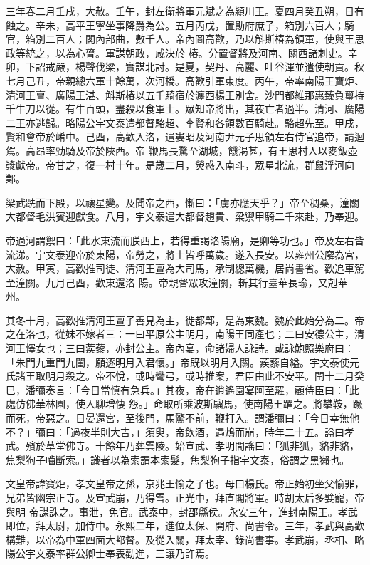 \begin{pinyinscope}
 三年春二月壬戌，大赦。壬午，封左衛將軍元斌之為潁川王。夏四月癸丑朔，日有蝕之。辛未，高平王寧坐事降爵為公。五月丙戌，置勛府庶子，箱別六百人；騎官，箱別二百人；閣內部曲，數千人。帝內圖高歡，乃以斛斯椿為領軍，使與王思政等統之，以為心膂。軍謀朝政，咸決於
 椿。分置督將及河南、關西諸刺史。辛卯，下詔戒嚴，楊聲伐梁，實謀北討。是夏，契丹、高麗、吐谷渾並遣使朝貢。秋七月己丑，帝親總六軍十餘萬，次河橋。高歡引軍東度。丙午，帝率南陽王寶炬、清河王亶、廣陽王湛、斛斯椿以五千騎宿於瀍西楊王別舍。沙門都維那惠臻負璽持千牛刀以從。有牛百頭，盡殺以食軍士。眾知帝將出，其夜亡者過半。清河、廣陽二王亦逃歸。略陽公宇文泰遣都督駱超、李賢和各領數百騎赴。駱超先至。甲戌，賢和會帝於崤中。己酉，高歡入洛，遣婁昭及河南尹元子思領左右侍官追帝，請迴駕。高昂率勁騎及帝於陜西。帝
 鞭馬長騖至湖城，饑渴甚，有王思村人以麥飯壺漿獻帝。帝甘之，復一村十年。是歲二月，熒惑入南斗，眾星北流，群鼠浮河向鄴。



 梁武跣而下殿，以禳星變。及聞帝之西，慚曰：「虜亦應天乎？」帝至稠桑，潼關大都督毛洪賓迎獻食。八月，宇文泰遣大都督趙貴、梁禦甲騎二千來赴，乃奉迎。



 帝過河謂禦曰：「此水東流而朕西上，若得重謁洛陽廟，是卿等功也。」帝及左右皆流涕。宇文泰迎帝於東陽，帝勞之，將士皆呼萬歲。遂入長安。以雍州公廨為宮，大赦。甲寅，高歡推司徒、清河王亶為大司馬，承制總萬機，居尚書省。歡追車駕至潼關。九月己酉，歡東還洛
 陽。帝親督眾攻潼關，斬其行臺華長瑜，又剋華州。



 其冬十月，高歡推清河王亶子善見為主，徙都鄴，是為東魏。魏於此始分為二。帝之在洛也，從妹不嫁者三：一曰平原公主明月，南陽王同產也；二曰安德公主，清河王懌女也；三曰蒺藜，亦封公主。帝內宴，命諸婦人詠詩。或詠鮑照樂府曰：「朱門九重門九閨，願逐明月入君懷。」帝既以明月入關。蒺藜自縊。宇文泰使元氏諸王取明月殺之。帝不悅，或時彎弓，或時推案，君臣由此不安平。閏十二月癸巳，潘彌奏言：「今日當慎有急兵。」其夜，帝在逍遙園宴阿至羅，顧侍臣曰：「此處仿佛華林園，使人聊增悽
 怨。」命取所乘波斯騮馬，使南陽王躍之。將攀鞍，蹶而死，帝惡之。日晏還宮，至後門，馬驚不前，鞭打入。謂潘彌曰：「今日幸無他不？」彌曰：「過夜半則大吉，」須臾，帝飲酒，遇鴆而崩，時年二十五。謚曰孝武。殯於草堂佛寺。十餘年乃葬雲陵。始宣武、孝明間謠曰：「狐非狐，貉非貉，焦梨狗子嚙斷索。」識者以為索謂本索髮，焦梨狗子指宇文泰，俗謂之黑獺也。



 文皇帝諱寶炬，孝文皇帝之孫，京兆王愉之子也。母曰楊氏。帝正始初坐父愉罪，兄弟皆幽宗正寺。及宣武崩，乃得雪。正光中，拜直閣將軍。時胡太后多嬖寵，帝與明
 帝謀誅之。事泄，免官。武泰中，封邵縣侯。永安三年，進封南陽王。孝武即位，拜太尉，加侍中。永熙二年，進位太保、開府、尚書令。三年，孝武與高歡構難，以帝為中軍四面大都督。及從入關，拜太宰、錄尚書事。孝武崩，丞相、略陽公宇文泰率群公卿士奉表勸進，三讓乃許焉。




\end{pinyinscope}
